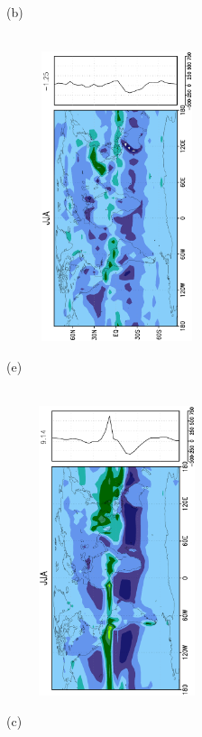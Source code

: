 \documentclass[12pt,a4paper,twoside,openright,headinclude,liststotoc,bibtotoc]{scrreprt}
\begin{document}
\begin{figure}[H]
{}
\parbox{8.5cm}{\hspace{0.50cm}\begin{scriptsize}(b)\end{scriptsize} \vspace{-0.7cm} \\
\includegraphics[height=8.5cm,width=6.5cm,angle=-90]
{eps/zonalfinalpluspeJJA.eps}
}
\parbox{8.5cm}{\hspace{0.35cm}\begin{scriptsize}(e)\end{scriptsize} \vspace{-0.7cm} \\
\includegraphics[height=8.5cm,width=6.5cm,angle=-90]
{eps/zonalt21finalpluspeJJA.eps}
}
\parbox{8.4cm}{\hspace{0.50cm}\begin{scriptsize}(c)\end{scriptsize} \vspace{-0.7cm} \\
}
\end{figure}
\end{document}
